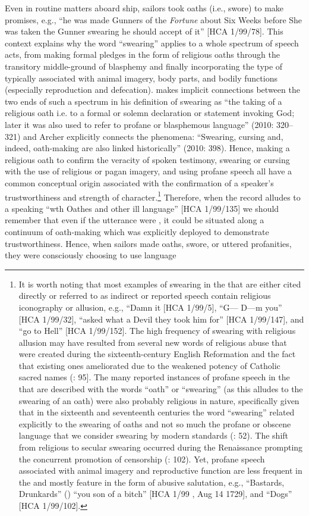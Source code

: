 Even in routine matters aboard ship, sailors took oaths (i.e., swore) to make promises, e.g., “he was made Gunners  of the \textit{Fortune} about Six Weeks before She was taken the Gunner swearing he should accept of it” [HCA 1/99/78]. This context explains why the word “swearing” applies to a whole spectrum of speech acts, from making formal pledges in the form of religious oaths through the transitory middle-ground of blasphemy and finally incorporating the type of  typically associated with animal imagery, body parts, and bodily functions (especially reproduction and defecation). \citeauthor{Gehweiler2010} makes implicit connections between the two ends of such a spectrum in his definition of swearing as “the taking of a religious oath i.e. to a formal or solemn declaration or statement invoking God; later it was also used to refer to profane or blasphemous language” (2010: 320–321) and Archer explicitly connects the phenomena: “Swearing, cursing and, indeed, oath-making are also linked historically” (2010: 398). Hence, making a religious oath to confirm the veracity of spoken testimony, swearing or cursing with the use of religious or pagan imagery, and using profane speech all have a common conceptual origin associated with the confirmation of a speaker’s trustworthiness and strength of character.\footnote{It is worth noting that most examples of swearing in the  that are either cited directly or referred to as indirect or reported speech contain religious iconography or allusion, e.g., “Damn it [HCA 1/99/5], “G— D—m you” [HCA 1/99/32], “asked what a Devil they took him for” [HCA 1/99/147], and “go to Hell” [HCA 1/99/152]. The high frequency of swearing with religious allusion may have resulted from several new words of religious abuse that were created during the sixteenth-century English Reformation and the fact that existing ones ameliorated due to the weakened potency of Catholic sacred names (\citealt{Hughes1991}: 95]. The many reported instances of profane speech in the  that are described with the words “oath” or “swearing” (as this alludes to the swearing of an oath) were also probably religious in nature, specifically given that in the sixteenth and seventeenth centuries the word “swearing” related explicitly to the swearing of oaths and not so much the profane or obscene language that we consider swearing by modern standards (\citealt{McEnery2006}: 52). The shift from religious to secular swearing occurred during the Renaissance prompting the concurrent promotion of censorship (\citealt{Hughes1991}: 102). Yet, profane speech associated with animal imagery and reproductive function are less frequent in the  and mostly feature in the form of abusive salutation, e.g., “Bastards, Drunkards”  (\citealt{Gage1648}) “you son of a bitch” [HCA 1/99 , Aug 14 1729], and “Dogs” [HCA 1/99/102].}  Therefore, when the record alludes to a  speaking “wth Oathes and other ill language” [HCA 1/99/135] we should remember that even if the utterance were , it could be situated along a continuum of oath-making which was explicitly deployed to demonstrate trustworthiness. Hence, when sailors made oaths, swore, or uttered profanities, they were consciously choosing to use language 